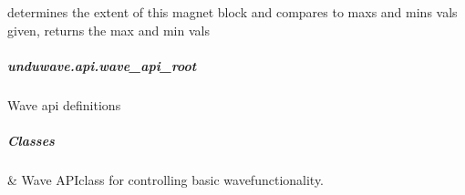 \documentclass[letterpaper,10pt,english]{sphinxmanual}
\begin{document}
\begin{fulllineitems}

\begin{fulllineitems}
\label{\detokenize{autoapi/unduwave/api/undu_api_root/index:unduwave.api.undu_api_root.undu_magnet_block_coords.get_max_extent}}
\pysigstartsignatures
{}
\pysigstopsignatures
\sphinxAtStartPar
determines the extent of this magnet block and compares to maxs and mins vals given, returns
the max and min vals

\end{fulllineitems}


\end{fulllineitems}


\sphinxstepscope


\subparagraph{unduwave.api.wave\_api\_root}
\label{\detokenize{autoapi/unduwave/api/wave_api_root/index:module-unduwave.api.wave_api_root}}\label{\detokenize{autoapi/unduwave/api/wave_api_root/index:unduwave-api-wave-api-root}}\label{\detokenize{autoapi/unduwave/api/wave_api_root/index::doc}}
\sphinxAtStartPar
Wave api definitions


\subparagraph{Classes}
\label{\detokenize{autoapi/unduwave/api/wave_api_root/index:classes}}

\begin{savenotes}\sphinxattablestart
\sphinxthistablewithglobalstyle
\sphinxthistablewithnovlinesstyle
\centering
\begin{tabulary}{\linewidth}[t]{}
\sphinxtoprule
\sphinxtableatstartofbodyhook
\sphinxAtStartPar
{\hyperref[\detokenize{autoapi/unduwave/api/wave_api_root/index:unduwave.api.wave_api_root.wave_api}]{}}
&
\sphinxAtStartPar
Wave API\sphinxhyphen{}class for controlling basic wave\sphinxhyphen{}functionality.
\\
\sphinxbottomrule
\end{tabulary}
\sphinxtableafterendhook\par
\sphinxattableend\end{savenotes}
\end{document}
